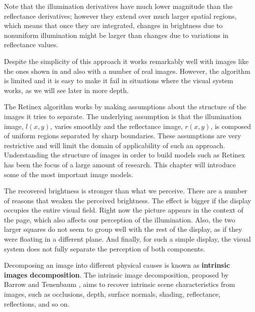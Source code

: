 Note that the illumination derivatives have much lower magnitude than the reflectance derivatives; however they extend over much larger spatial regions, which means that once they are integrated, changes in brightness due to nonuniform illumination might be larger than changes due to variations in reflectance values. 

Despite the simplicity of this approach it works remarkably well with images like the ones shown in \fig{\ref{fig:simultaneous}} and also with a number of real images. However, the algorithm is limited and it is easy to make it fail in situations where the visual system works, as we will see later in more depth.

The Retinex algorithm works by making assumptions about the structure of the images it tries to separate. The underlying assumption is that the illumination image, $l(x,y)$, varies smoothly and the reflectance image, $r(x,y)$, is composed of uniform regions separated by sharp boundaries. These assumptions are very restrictive and will limit the domain of applicability of such an approach. Understanding the structure of images in order to build models such as Retinex has been the focus of a large amount of research. This chapter will introduce some of the most important image models.

The recovered brightness is stronger than what we perceive. There are a number of reasons that weaken the perceived brightness. The effect is bigger if the display occupies the entire visual field. Right now the picture appears in the context of the page, which also affects our perception of the illumination. Also, the two larger squares do not seem to group well with the rest of the display, as if they were floating in a different plane. And finally, for such a simple display, the visual system does not fully separate the perception of both components. 

Decomposing an image into different physical causes is known as {\bf intrinsic images decomposition}. 
The intrinsic image decomposition, proposed by Barrow and Tenenbaum \cite{Barrow1978}, aims to recover intrinsic scene characteristics from images, such as occlusions, depth, surface normals, shading, reflectance, reflections, and so on. 


